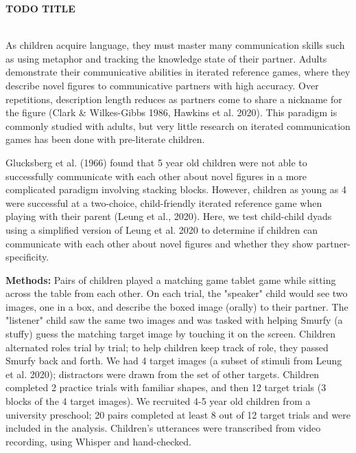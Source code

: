 \documentclass[11pt,a4paper]{article}
\renewcommand{\title}[1]{\textbf{#1}\\}
\newcommand{\authors}[1]{\iftoggle{anonymous}{\phantom{#1}}{#1}\\}
\newcommand{\email}[1]{\iftoggle{anonymous}{\phantom{#1}}{#1}}
\begin{document}


\title{TODO TITLE}
\authors{Veronica Boyce, Ilaria Chen, Bobby Sparks, Malia Perez, Michael C. Frank} 
\email{vboyce@stanford.edu;  Stanford University}
\newline
%




As children acquire language, they must master many communication skills such as using metaphor and tracking the knowledge state of their partner. Adults demonstrate their communicative abilities in iterated reference games, where they describe novel figures to communicative partners with high accuracy. Over repetitions, description length reduces as partners come to share a nickname for the figure (Clark \& Wilkes-Gibbs 1986, Hawkins et al. 2020). This paradigm is commonly studied with adults, but very little research on iterated communication games has been done with pre-literate children. 

Glucksberg et al. (1966) found that 5 year old children were not able to successfully communicate with each other about novel figures in a more complicated paradigm involving stacking blocks. However, children as young as 4 were successful at a two-choice, child-friendly iterated reference game when playing with their parent (Leung et al., 2020). Here, we test child-child dyads using a simplified version of Leung et al. 2020 to determine if children can communicate with each other about novel figures and whether they show partner-specificity. 



\textbf{Methods:} Pairs of children played a matching game tablet game while sitting across the table from each other. On each trial, the "speaker" child would see two images, one in a box, and describe the boxed image (orally) to their partner. The "listener" child saw the same two images and was tasked with helping Smurfy (a stuffy) guess the matching target image by touching it on the screen. Children alternated roles trial by trial; to help children keep track of role, they passed Smurfy back and forth. We had 4 target images (a subset of stimuli from Leung et al. 2020); distractors were drawn from the set of other targets. Children completed 2 practice trials with familiar shapes, and then 12 target trials (3 blocks of the 4 target images). We recruited 4-5 year old children from a university preschool; 20 pairs completed at least 8 out of 12 target trials and were included in the analysis. Children's utterances were transcribed from video recording, using Whisper and hand-checked. 
\end{document}
